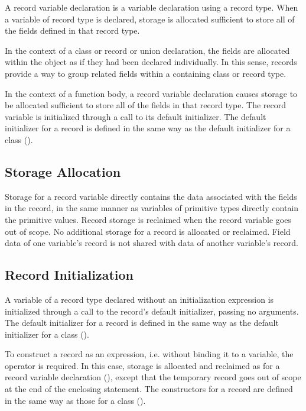 A record variable declaration is a variable declaration using a record type.
When a variable of record type is declared, storage is allocated sufficient to
store all of the fields defined in that record type.

In the context of a class or record or union declaration, the fields are
allocated within the object as if they had been declared individually.  In this
sense, records provide a way to group related fields within a containing class
or record type.

In the context of a function body, a record variable declaration
causes storage to be allocated sufficient to store all of the fields in that
record type.  The record variable is initialized through a call to its
default initializer.  The default initializer for a record is defined in the
same way as the default initializer for a class ().

\subsection{Storage Allocation}
\label{Record_Storage}

Storage for a record variable directly contains the data associated
with the fields in the record, in the same manner as variables
of primitive types directly contain the primitive values.
Record storage is reclaimed when the record variable goes out of scope.
No additional storage for a record is allocated or reclaimed.
Field data of one variable's record is not shared with data
of another variable's record.

\subsection{Record Initialization}
\label{Record_Initialization}

A variable of a record type declared without an initialization expression
is initialized through a call to the record's default initializer,
passing no arguments.  The default initializer for a record is defined in
the same way as the default initializer for a class
().

To construct a record as an expression,
i.e. without binding it to a variable, the  operator is
required.  In this case, storage is allocated and reclaimed as for a record
variable declaration (), except that the temporary record
goes out of scope at the end of the enclosing statement.
The constructors for a record are
defined in the same way as those for a class ().

